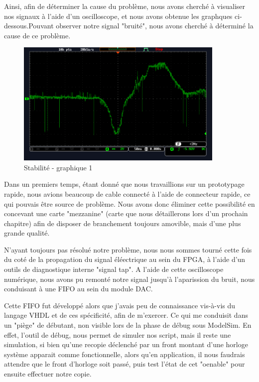 \documentclass[french,a4paper,12pt]{report}
\begin{document}
		Ainsi, afin de déterminer la cause du problème, nous avons cherché à visualiser nos signaux à l'aide d'un oscilloscope, et nous avons obtenue les graphques ci-dessous.Pouvant observer notre signal "bruité", nous avons cherché à déterminé la cause de ce problème.
		
		\begin{figure}[!ht]
    \center
  	\includegraphics[width=10cm]{bruit1.PNG}
		\caption{Stabilité - graphique 1}
	\end{figure}
	
	Dans un premiers temps, étant donné que nous travaillions sur un prototypage rapide, nous avions beaucoup de cable connecté à l'aide de connecteur rapide, ce qui pouvais être source de problème. Nous avons donc éliminer cette possibilité en concevant une carte "mezzanine" (carte que nous détaillerons lors d'un prochain chapitre) afin de disposer de branchement toujours amovible, mais d'une plus grande qualité.
	
	N'ayant toujours pas résolué notre problème, nous nous sommes tourné cette fois du coté de la propagation du signal éléectrique au sein du FPGA, à l'aide d'un outils de diagnostique interne "signal tap". A l'aide de cette oscilloscope numérique, nous avons pu remonté notre signal jusqu'à l'aparission du bruit, nous conduisant à une FIFO au sein du module DAC.
	
	Cette FIFO fut développé alors que j'avais peu de connaissance vis-à-vis du langage VHDL et de ces spécificité, afin de m'exercer. Ce qui me conduisit dans un "piège" de débutant, non visible lors de la phase de débug sous ModelSim. En effet, l'outil de débug, nous permet de simuler nos script, mais il reste une simulation, si bien qu'une recopie déclenché par un front montant d'une horloge système apparait comme fonctionnelle, alors qu'en application, il nous faudrais attendre que le front d'horloge soit passé, puis test l'état de cet "oenable" pour ensuite effectuer notre copie.
	
\end{document}
